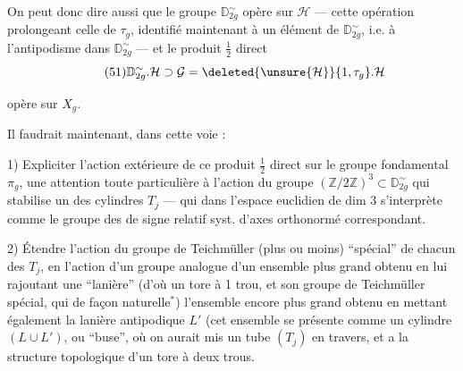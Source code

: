 On peut donc dire aussi que le groupe $\mathbb D_{2g}^\sim$
opère sur $\mathcal H$ --- cette opération prolongeant celle
de $\tau_g$, identifié maintenant à un
élément de $\mathbb D_{2g}^\sim$, i.e. à l'antipodisme dans
$\mathbb D_{2g}^\sim$ --- et le produit $\frac12$ direct
\[
\tag{51}
\mathbb D_{2g}^\sim.\mathcal H\supset\mathcal G
=\deleted{\unsure{\mathcal H}}\{1,\tau_g\}.\mathcal H
\]


opère sur $X_g$.

Il faudrait maintenant, dans cette voie :

1) Expliciter l'action extérieure de ce produit $\frac12$ direct sur le groupe fondamental $\pi_g$,  une attention toute particulière à l'action du groupe $(\mathbb Z/2\mathbb Z)^3\subset\mathbb D_{2g}^{\sim}$ qui stabilise un des cylindres $T_j$ --- qui dans l'espace euclidien de dim 3 s'interprète comme le groupe des  de signe relatif  syst. d'axes orthonormé correspondant.

2) Étendre l'action  du groupe de Teichmüller (plus ou moins) ``spécial'' de chacun des $T_j$, en l'action d'un groupe analogue d'un ensemble plus grand obtenu en lui rajoutant une ``lanière''  (d'où un tore à 1 trou, et son groupe de Teichmüller spécial, qui  de façon naturelle$^*$)  l'ensemble encore plus grand obtenu en mettant également la lanière antipodique $L'$ (cet ensemble se présente comme un cylindre $(L\cup L')$, ou ``buse'', où on aurait mis un tube $(T_j)$ en travers, et a la structure topologique d'un tore à deux trous.

